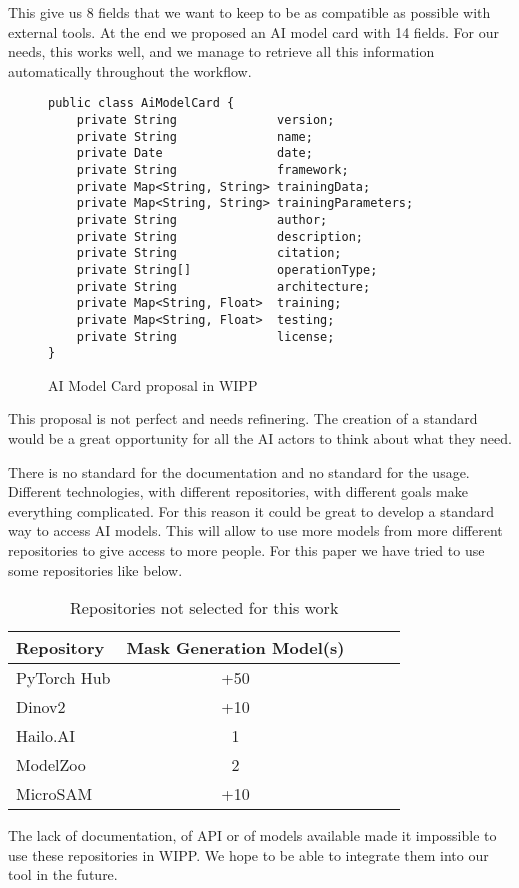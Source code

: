 This give us 8 fields that we want to keep to be as compatible as possible with
external tools. At the end we proposed an AI model card with 14 fields. For our
needs, this works well, and we manage to retrieve all this information
automatically throughout the workflow.

\begin{figure}[H]
\centering
\begin{verbatim}
public class AiModelCard {
    private String              version;
    private String              name;
    private Date                date;
    private String              framework;
    private Map<String, String> trainingData;
    private Map<String, String> trainingParameters;
    private String              author;
    private String              description;
    private String              citation;
    private String[]            operationType;
    private String              architecture;
    private Map<String, Float>  training;
    private Map<String, Float>  testing;
    private String              license;
}
\end{verbatim}
\caption{AI Model Card proposal in WIPP}
\end{figure}

This proposal is not perfect and needs refinering. The creation of a standard
would be a great opportunity for all the AI actors to think about what they
need.

There is no standard for the documentation and no standard for the usage.
Different technologies, with different repositories, with different goals make
everything complicated. For this reason it could be great to develop a standard
way to access AI models. This will allow to use more models from more different
repositories to give access to more people. For this paper we have tried to use
some repositories like below.

\begin{table}[H]
    \centering
    \caption{\label{tab:discussion}%
        Repositories not selected for this work
    }
    \begin{tabular}{lcccc}
      \toprule
      Repository & Mask Generation Model(s) \\
      \midrule
      PyTorch Hub & +50 \\
      Dinov2 & +10 \\
      Hailo.AI & 1 \\
      ModelZoo & 2 \\
      MicroSAM & +10 \\
      \bottomrule
    \end{tabular}
\end{table}

The lack of documentation, of API or of models available made it impossible to
use these repositories in WIPP. We hope to be able to integrate them into our
tool in the future.
